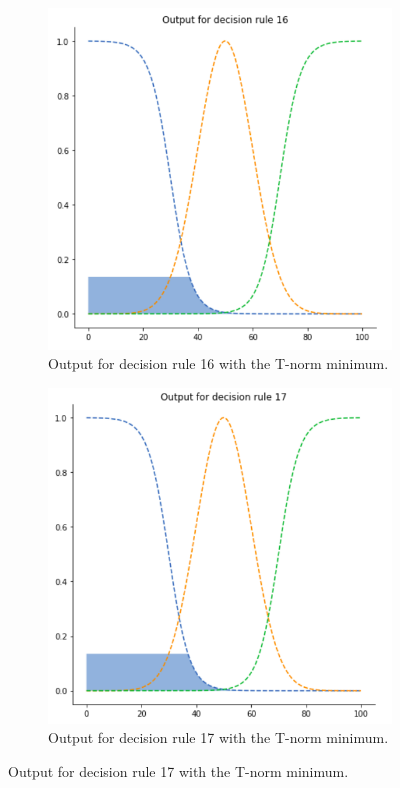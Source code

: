 \begin{figure}[ht]
\begin{subfigure}{.5\textwidth}
  \centering
  \includegraphics[width=.8\linewidth]{figures/first/min1.png}  
  \caption{Output for decision rule 16 with the T-norm minimum.}
  \label{fig:1min1}
\end{subfigure}
\begin{subfigure}{.5\textwidth}
  \centering
  \includegraphics[width=.8\linewidth]{figures/first/min2.png}  
  \caption{Output for decision rule 17 with the T-norm minimum.}
  \label{fig:1min2}
\end{subfigure}

\end{figure}
